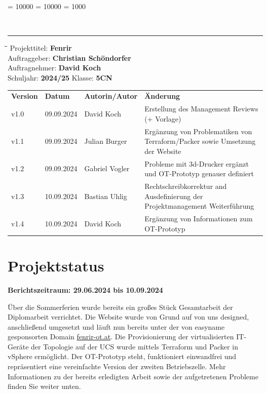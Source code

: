 \documentclass[
	headings=optiontotocandhead,%
	oneside,
	numbers=noenddot,%
	toc=flat, %
	10pt, %
	parskip=full, %
	listof=totoc, %
	listof=flat, %
	numbers=noenddot, %
	bibliography=totoc, %
	a4paper,DIV=14,
]{scrartcl}
\newcommand\Tstrut{\rule{0pt}{3.2ex}}         %
\newcommand\Bstrut{\rule[-1.5ex]{0pt}{0pt}}   %
\newenvironment{nstabbing}
	{\setlength{\topsep}{-\parskip}
		\setlength{\partopsep}{-\parskip}
		\tabbing}
	{\endtabbing}
\begin{document}
\clubpenalty = 10000 %
\widowpenalty = 10000 %
\displaywidowpenalty = 1000

{\sffamily{\textbf{\LARGE{\textcolor{orange}{Management Review}}}}}\\
\noindent\rule{\textwidth}{0.1pt}
\begin{nstabbing}
	\hspace{4cm}\=\hspace{4cm}\=\hspace{4cm}\=\kill
	Projekttitel: \> \textbf{Fenrir}\\
	Auftraggeber: \> \textbf{Christian Schöndorfer}\\
	Auftragnehmer: \> \textbf{David Koch}\\
	Schuljahr: \> \textbf{2024/25}
	\> Klasse: \> \textbf{5CN}\\
\end{nstabbing}
{\smaller
	\begin{tabularx}{\textwidth}{l l l l}
	\hline
	\textbf{Version} & \textbf{Datum} & \textbf{Autorin/Autor} & \textbf{Änderung}\Tstrut  \\
	v1.0 & 09.09.2024 & David Koch & Erstellung des Management Reviews (+ Vorlage)  \\
	v1.1 & 09.09.2024 & Julian Burger & Ergänzung von Problematiken von Terraform/Packer sowie Umsetzung der Website  \\
	v1.2 & 09.09.2024 & Gabriel Vogler & Probleme mit 3d-Drucker ergänzt und OT-Prototyp genauer definiert  \\
	v1.3 & 10.09.2024 & Bastian Uhlig & Rechtschreibkorrektur and Ausdefinierung der Projektmanagement Weiterführung  \\
	v1.4 & 10.09.2024 & David Koch & Ergänzung von Informationen zum OT-Prototyp\Bstrut  \\
	\hline
	\end{tabularx}
}

\section{Projektstatus}
\textbf{Berichtszeitraum: 29.06.2024 bis 10.09.2024}

Über die Sommerferien wurde bereits ein großes Stück Gesamtarbeit der Diplomarbeit verrichtet. Die Website wurde von Grund auf von uns designed, anschließend umgesetzt und läuft nun bereits unter der von easyname gesponsorten Domain \url{fenrir-ot.at}. Die Provisionierung der virtualisierten IT-Geräte der Topologie auf der UCS wurde mittels Terraform und Packer in vSphere ermöglicht. Der OT-Prototyp steht, funktioniert einwandfrei und repräsentiert eine vereinfachte Version der zweiten Betriebszelle. Mehr Informationen zu der bereits erledigten Arbeit sowie der aufgetretenen Probleme finden Sie weiter unten.
\end{document}
